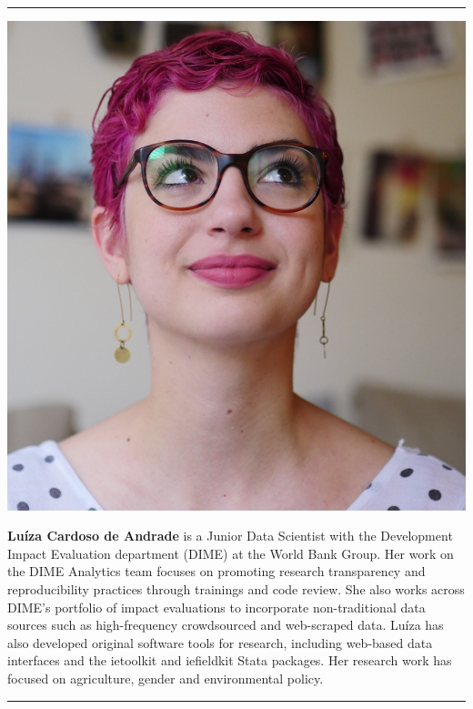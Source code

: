 \documentclass[
]{book}
\begin{document}
\begin{center}\rule{0.5\linewidth}{0.5pt}\end{center}

\includegraphics{author-bios/luiza-pic.jpg}

\textbf{Luíza Cardoso de Andrade} is a Junior Data Scientist with the Development Impact Evaluation department (DIME) at the World Bank Group. Her work on the DIME Analytics team focuses on promoting research transparency and reproducibility practices through trainings and code review. She also works across DIME's portfolio of impact evaluations to incorporate non-traditional data sources such as high-frequency crowdsourced and web-scraped data. Luíza has also developed original software tools for research, including web-based data interfaces and the ietoolkit and iefieldkit Stata packages. Her research work has focused on agriculture, gender and environmental policy.

\begin{center}\rule{0.5\linewidth}{0.5pt}\end{center}
\end{document}

